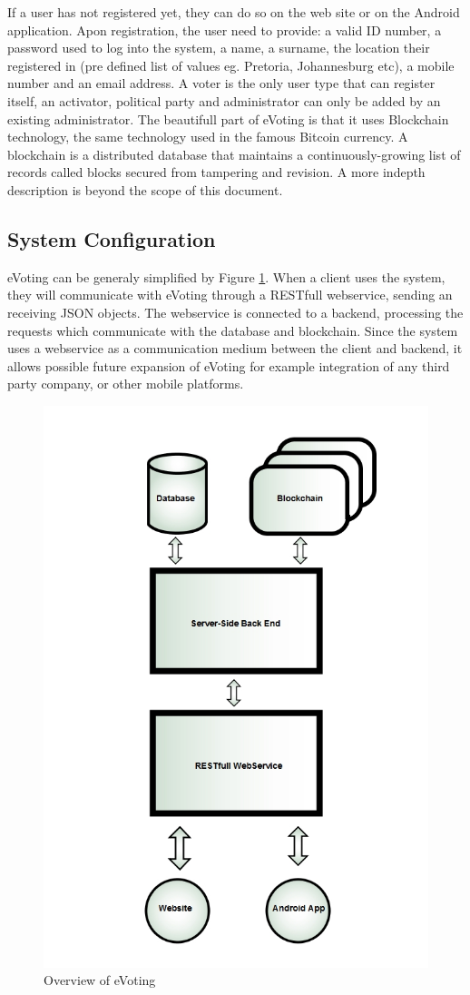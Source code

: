 \documentclass[11pt]{article}
\begin{document}
	If a user has not registered yet, they can do so on the web site or on the Android application. Apon registration, the user need to provide: a valid ID number, a password used to log into the system, a name, a surname, the location their registered in (pre defined list of values eg. Pretoria, Johannesburg etc), a mobile number and an email address. A voter is the only user type that can register itself, an activator, political party and administrator can only be added by an existing administrator.\newline\newline
	The beautifull part of eVoting is that it uses Blockchain technology, the same technology used in the famous Bitcoin currency. A blockchain is a distributed database that maintains a continuously-growing list of records called blocks secured from tampering and revision. A more indepth description is beyond the scope of this document.
	
	\subsection{System Configuration}
	eVoting can be generaly simplified by Figure \ref{fig:overview}. When a client uses the system, they will communicate with eVoting through a RESTfull webservice, sending an receiving JSON objects. The webservice is connected to a backend, processing the requests which communicate with the database and blockchain. Since the system uses a webservice as a communication medium between the client and backend, it allows possible future expansion of eVoting for example integration of any third party company, or other mobile platforms.
					\begin{figure}[H]
						\centering
						\includegraphics[width=0.75\linewidth]{../Images/UserManual/SystemConfiguration1.jpg}
						\caption{Overview of eVoting}
						\label{fig:overview}
					\end{figure}
					
\end{document}
